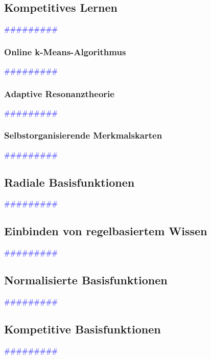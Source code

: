 \documentclass{article}
\begin{document}
  \subsection{Kompetitives Lernen} %
      \textcolor{blue}{\#\#\#\#\#\#\#\#\#}
    \subsubsection{Online k-Means-Algorithmus} %
      \textcolor{blue}{\#\#\#\#\#\#\#\#\#}
    \subsubsection{Adaptive Resonanztheorie} %
      \textcolor{blue}{\#\#\#\#\#\#\#\#\#}
    \subsubsection{Selbstorganisierende Merkmalskarten} %
      \textcolor{blue}{\#\#\#\#\#\#\#\#\#}
  \subsection{Radiale Basisfunktionen} %
      \textcolor{blue}{\#\#\#\#\#\#\#\#\#}
  \subsection{Einbinden von regelbasiertem Wissen} %
      \textcolor{blue}{\#\#\#\#\#\#\#\#\#}
  \subsection{Normalisierte Basisfunktionen} %
      \textcolor{blue}{\#\#\#\#\#\#\#\#\#}
  \subsection{Kompetitive Basisfunktionen} %
      \textcolor{blue}{\#\#\#\#\#\#\#\#\#}
\end{document}
